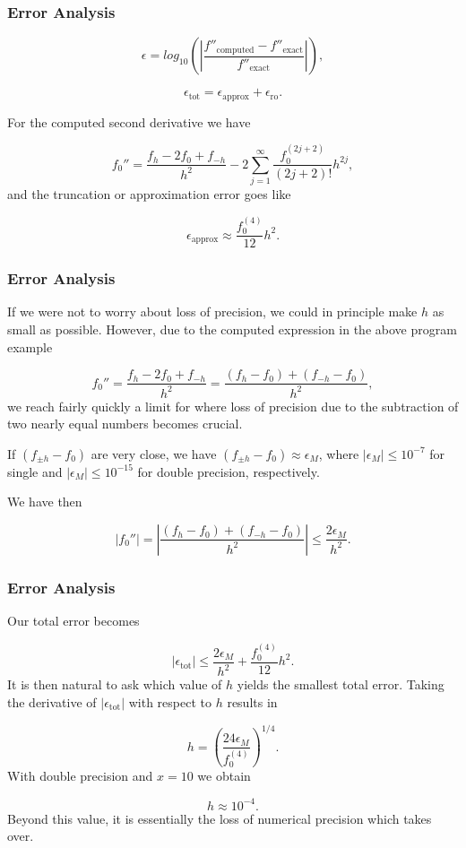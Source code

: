 \documentclass{beamer}
\newenvironment{block_mdfboxadmon}[1][]{\begin{block}{#1}}{\end{block}}
\begin{document}
\begin{frame}
\frametitle{Error Analysis}

\begin{block_mdfboxadmon}[]
\[
   \epsilon=log_{10}\left(\left|\frac{f''_{\mbox{computed}}-f''_{\mbox{exact}}}
                 {f''_{\mbox{exact}}}\right|\right),
\]

\[
   \epsilon_{\mbox{tot}}=\epsilon_{\mbox{approx}}+\epsilon_{\mbox{ro}}.
\]

For the computed second derivative  we have

\[
 f_0''=\frac{ f_h -2f_0 +f_{-h}}{h^2}-2\sum_{j=1}^{\infty}\frac{f_0^{(2j+2)}}{(2j+2)!}h^{2j},
\]
and the truncation or approximation error goes like

\[
  \epsilon_{\mbox{approx}}\approx \frac{f_0^{(4)}}{12}h^{2}.
\]
\end{block_mdfboxadmon}
\end{frame}

\begin{frame}
\frametitle{Error Analysis}

\begin{block_mdfboxadmon}[]
If we were not to worry about loss of precision, we could in principle
make $h$ as small as possible.
However, due to the computed expression in the above program example

\[
 f_0''=\frac{ f_h -2f_0 +f_{-h}}{h^2}=\frac{ (f_h -f_0) +(f_{-h}-f_0)}{h^2},
\]
we reach fairly quickly a limit for where loss of precision due to the subtraction
of two nearly equal numbers becomes crucial.

If $(f_{\pm h} -f_0)$ are very close, we have
$(f_{\pm h} -f_0)\approx \epsilon_M$, where $|\epsilon_M|\le 10^{-7}$ for single and
$|\epsilon_M|\le 10^{-15}$ for double precision, respectively.

We have then

\[
 \left|f_0''\right|=
 \left|\frac{ (f_h -f_0) +(f_{-h}-f_0)}{h^2}\right|\le \frac{ 2 \epsilon_M}{h^2}.
\]
\end{block_mdfboxadmon}
\end{frame}

\begin{frame}
\frametitle{Error Analysis}

\begin{block_mdfboxadmon}[]
Our total error becomes

\[
   \left|\epsilon_{\mbox{tot}}\right|\le  \frac{2 \epsilon_M}{h^2} +
                          \frac{f_0^{(4)}}{12}h^{2}.
    \label{eq:experror}
\]
It is then natural to ask which value of $h$ yields the smallest
total error. Taking the derivative of $\left|\epsilon_{\mbox{tot}}\right|$
with respect to $h$ results in

\[
   h= \left(\frac{ 24\epsilon_M}{f_0^{(4)}}\right)^{1/4}.
\]
With double precision and $x=10$ we obtain

\[
   h\approx 10^{-4}.
\]
Beyond this value, it is essentially the loss of numerical precision
which takes over.
\end{block_mdfboxadmon}
\end{frame}
\end{document}
